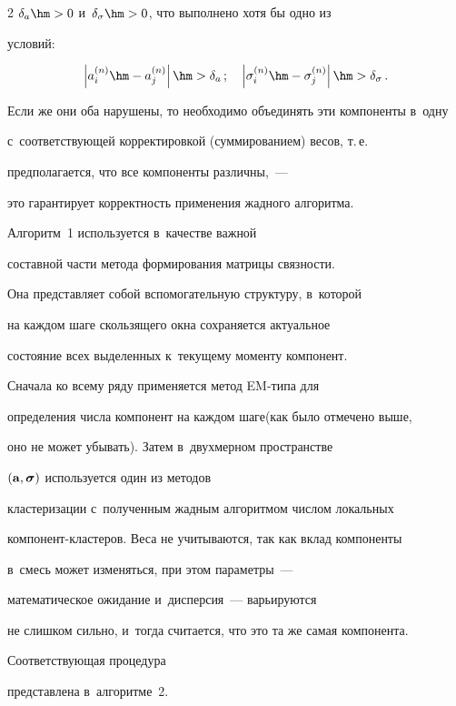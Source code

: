 \begin{multicols}{2}
$\delta_a\hm>0$ и~$\delta_\sigma\hm>0$, что выполнено хотя бы одно из 

условий: 

$$

\left|a_i^{(n)}\hm-a_j^{(n)}\right|\hm>\delta_a\,; \quad

\left|\sigma_i^{(n)}\hm-\sigma_j^{(n)}\right|\hm>\delta_\sigma\,.

$$

Если же они оба нарушены, то необходимо объединять эти компоненты в~одну 

с~соответствующей корректировкой (суммированием) весов, т.\,е.\ 

предполагается, что все компоненты различны,~--- 

это гарантирует кор\-рект\-ность применения жад\-но\-го алгоритма.



Алгоритм~1 используется в~качестве важ\-ной 

со\-став\-ной час\-ти  метода формирования матрицы связ\-ности. 

Она пред\-став\-ля\-ет собой вспомогательную структуру, в~которой 

на каждом шаге скользящего окна сохраняется актуальное 

со\-сто\-яние всех выделенных к~текущему моменту компонент. 

Сначала ко всему ряду применяется метод EM-ти\-па для 

определения числа компонент на каждом шаге\linebreak (как было отмечено выше, 

оно не может убывать). Затем в~двухмерном пространстве 

$(\bf a, \boldsymbol \sigma)$ используется один из методов 

кластеризации с~полученным жад\-ным алгоритмом чис\-лом локальных 

ком\-по\-нент-клас\-те\-ров. Веса не учитываются, так как вклад компоненты 

в~смесь может изменяться, при этом па\-ра\-мет\-ры~--- 

математическое ожидание и~дис\-пер\-сия~--- варьи\-ру\-ют\-ся 

не слишком сильно, и~тогда считается, что это та же самая компонента. 

Со\-от\-вет\-ст\-ву\-ющая процедура 

пред\-став\-ле\-на в~алго\-ритме~2.




\end{multicols}
